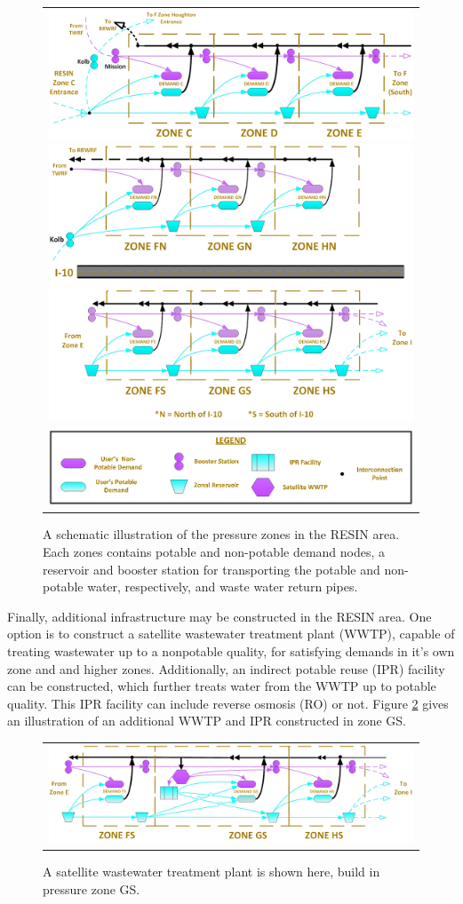 \documentclass[opre,nonblindrev]{informs3} %
\begin{document}
\begin{figure}
	\FIGURE
	{%
		\begin{tabular}{c}
			\includegraphics*[width=.5\textwidth]{tucson_water_images/zones_c_e.png}%
			\includegraphics*[width=.5\textwidth]{tucson_water_images/zones_split.png} \\
			\includegraphics*[width=.6\textwidth]{tucson_water_images/zones_legend.png}
		\end{tabular}
	}
	{
		A schematic illustration of the pressure zones in the RESIN area.
		Each zones contains potable and non-potable demand nodes, a reservoir and booster station for transporting the potable and non-potable water, respectively, and waste water return pipes.
		\label{fig:tucson_zones}
	}
	{}
\end{figure}

Finally, additional infrastructure may be constructed in the RESIN area.
One option is to construct a satellite wastewater treatment plant (WWTP), capable of treating wastewater up to a nonpotable quality, for satisfying demands in it's own zone and and higher zones.
Additionally, an indirect potable reuse (IPR) facility can be constructed, which further treats water from the WWTP up to potable quality.
This IPR facility can include reverse osmosis (RO) or not.
Figure \ref{fig:tucson_zones_wwtp} gives an illustration of an additional WWTP and IPR constructed in zone GS.

\begin{figure}
	\FIGURE
	{%
		\begin{tabular}{c}
			\includegraphics*[width=.8\textwidth]{tucson_water_images/zones_south_ipr.png}%
		\end{tabular}
	}
	{
		A satellite wastewater treatment plant is shown here, build in pressure zone GS.
		\label{fig:tucson_zones_wwtp}
	}
	{}
\end{figure}
\end{document}
